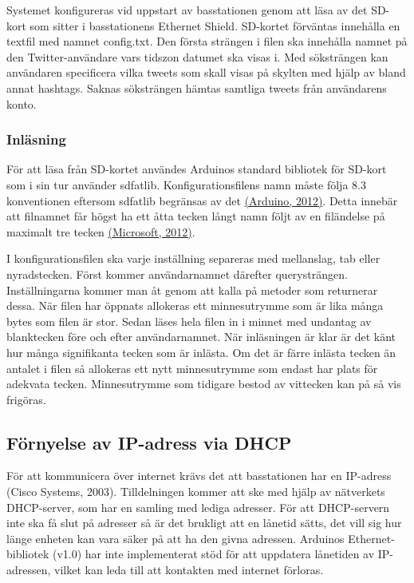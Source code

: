\documentclass[a4paper,11pt]{article}
\begin{document}
Systemet konfigureras vid uppstart av basstationen genom att läsa av det SD-kort som sitter i basstationens Ethernet Shield. SD-kortet förväntas innehålla en textfil med namnet config.txt. Den första strängen i filen ska innehålla namnet på den Twitter-användare vars tidszon datumet ska visas i. Med söksträngen kan användaren specificera vilka tweets som skall visas på skylten med hjälp av bland annat hashtags. Saknas söksträngen hämtas samtliga tweets från användarens konto.

\subsubsection{Inläsning}
För att läsa från SD-kortet användes Arduinos standard bibliotek för SD-kort som i sin tur använder sdfatlib. Konfigurationsfilens namn måste följa 8.3 konventionen eftersom sdfatlib begränsas av det \hyperref[arduino]{(Arduino, 2012)}. Detta innebär att filnamnet får högst ha ett åtta tecken långt namn följt av en filändelse på maximalt tre tecken \hyperref[microsoft]{(Microsoft, 2012)}.

I konfigurationsfilen ska varje inställning separeras med mellanslag, tab eller nyradstecken. Först kommer användarnamnet därefter querysträngen. Inställningarna kommer man åt genom att kalla på metoder som returnerar dessa. När filen har öppnats allokeras ett minnesutrymme som är lika många bytes som filen är stor. Sedan läses hela filen in i minnet med undantag av blanktecken före och efter användarnamnet. När inläsningen är klar är det känt hur många signifikanta tecken som är inlästa. Om det är färre inlästa tecken än antalet i filen så allokeras ett nytt minnesutrymme som endast har plats för adekvata tecken. Minnesutrymme som tidigare bestod av vittecken kan på så vis frigöras.

\subsection{Förnyelse av IP-adress via DHCP}
För att kommunicera över internet krävs det att basstationen har en IP-adress (Cisco Systems, 2003). Tilldelningen kommer att ske med hjälp av nätverkets DHCP-server, som har en samling med lediga adresser. För att DHCP-servern inte ska få slut på adresser så är det brukligt att en lånetid sätts, det vill sig hur länge enheten kan vara säker på att ha den givna adressen. Arduinos Ethernet-bibliotek (v1.0) har inte implementerat stöd för att uppdatera lånetiden av IP-adressen, vilket kan leda till att kontakten med internet förloras.\\
\end{document}
